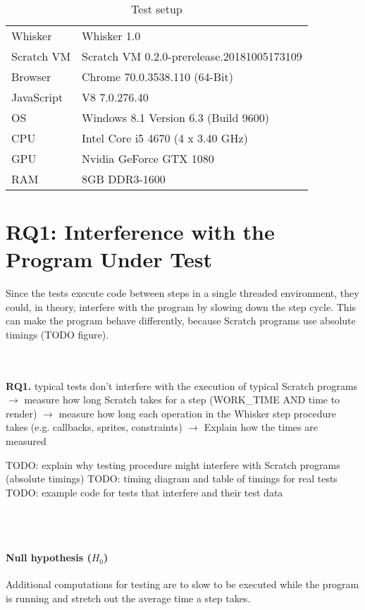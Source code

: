 \begin{table}
    \centering
    \scriptsize \tt
    \begin{tabular}{ll}
        \toprule
        Whisker    & Whisker     1.0 \\
        Scratch VM & Scratch VM  0.2.0-prerelease.20181005173109 \\
        Browser    & Chrome      70.0.3538.110 (64-Bit) \\
        JavaScript & V8          7.0.276.40 \\
        OS         & Windows 8.1 Version 6.3 (Build 9600) \\
        CPU        & Intel Core i5 4670 (4 x  3.40 GHz) \\
        GPU        & Nvidia GeForce GTX 1080 \\
        RAM        & 8GB DDR3-1600 \\
        \bottomrule
    \end{tabular}
    \caption{Test setup}
    \label{tab:test_setup}
\end{table}

\section{RQ1: Interference with the Program Under Test}

Since the tests execute code between steps in a single threaded environment,
they could, in theory, interfere with the program by slowing down the step cycle.
This can make the program behave differently, because Scratch programs use absolute timings (TODO figure).

~\\~\\
\textbf{RQ1.} typical tests don't interfere with the execution of typical Scratch programs
$\rightarrow$ measure how long Scratch takes for a step (WORK\_TIME AND time to render)
$\rightarrow$ measure how long each operation in the Whisker step procedure takes (e.g. callbacks, sprites, constraints)
$\rightarrow$ Explain how the times are measured

TODO: explain why testing procedure might interfere with Scratch programs (absolute timings)
TODO: timing diagram and table of timings for real tests
TODO: example code for tests that interfere and their test data

~\\~\\
\paragraph{Null hypothesis ($H_0$)}
Additional computations for testing are to slow to be executed while the program is running and stretch out the average time a step takes.
